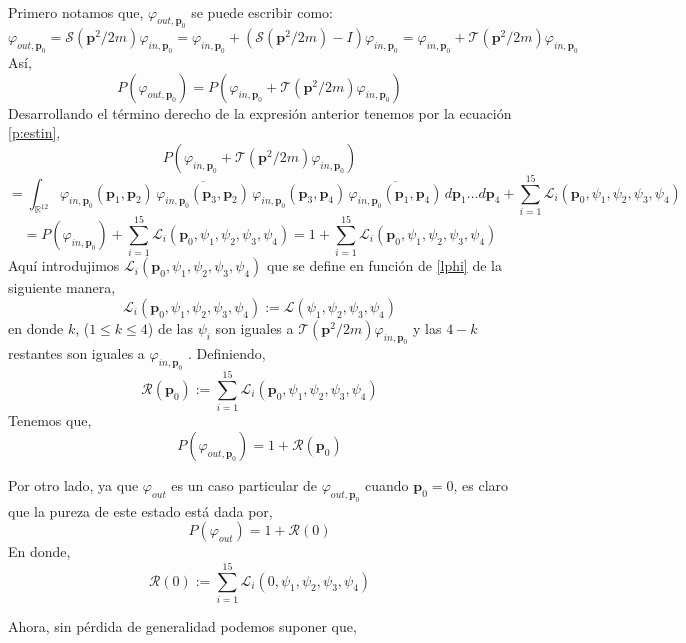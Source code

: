 \documentclass[12pt]{book}
\numberwithin{equation}{chapter}
\def\n{\noindent}
\def\ol{\overline}
\def\R{\mathbb{R}}
\def\S{\mathcal{S}}
\def\T{\mathcal{T}}
\def\L{\mathcal{L}}
\def\Rr{\mathcal{R}}
\def\vp{\varphi}
\def\P{\mathbf{p}}
\begin{document}
\n {\bf Demostraci\'on}\\
Primero notamos que, $\vp_{out,\P_{0}}$ se puede escribir como:
$$ \vp_{out,\P_{0}} = \S(\P^{2}/2m) \vp_{in,\P_{0}} = \vp_{in,\P_{0}} +( \S(\P^{2}/2m) - I ) \vp_{in,\P_{0}} = \vp_{in,\P_{0}} + \T(\P^{2}/2m) \vp_{in,\P_{0}} $$
As\'i,
$$ P(\vp_{out,\P_{0}})= P \left( \vp_{in,\P_{0}} + \T(\P^{2}/2m) \vp_{in,\P_{0}} \right) $$
Desarrollando el t\'ermino derecho de la expresi\'on anterior tenemos por la ecuaci\'on \eqref{p:estin},
$$ P \left(\vp_{in,\P_{0}} + \T(\P^{2}/2m) \vp_{in,\P_{0}} \right) $$
$$ = \int_{\R^{12}} \vp_{in,\P_{0}}(\P_{1},\P_{2}) \, \ol{ \vp_{in,\P_{0}}(\P_{3},\P_{2}) } \, \vp_{in,\P_{0}}(\P_{3},\P_{4}) \, \ol{ \vp_{in,\P_{0}}(\P_{1},\P_{4}) } \, d\P_{1} ... d\P_{4} + \sum_{i=1}^{15} \L_{i}(\P_{0}, \psi_{1},\psi_{2},\psi_{3},\psi_{4}) $$
$$= P(\vp_{in,\P_{0}}) + \sum_{i=1}^{15} \L_{i}(\P_{0}, \psi_{1},\psi_{2},\psi_{3},\psi_{4}) = 1 + \sum_{i=1}^{15} \L_{i}(\P_{0}, \psi_{1},\psi_{2},\psi_{3},\psi_{4}) $$
Aqu\'i introdujimos $\L_{i}(\P_{0}, \psi_{1},\psi_{2},\psi_{3},\psi_{4})$ que se define en funci\'on de \eqref{lphi} de la siguiente manera,
\begin{equation}\label{li_p0}
\L_{i}(\P_{0}, \psi_{1},\psi_{2},\psi_{3},\psi_{4}) := \L(\psi_{1},\psi_{2},\psi_{3},\psi_{4})
\end{equation}
en donde $k$, ($ 1 \leq k \leq 4 $) de las $\psi_{i}$ son iguales a $\T(\P^{2}/2m) \vp_{in,\P_{0}} $ y las $4-k$ restantes son iguales a $\vp_{in,\P_{0}}$ . Definiendo,
\begin{equation}\label{R_p0}
\Rr (\P_{0}) :=\sum_{i=1}^{15} \L_{i}(\P_{0}, \psi_{1},\psi_{2},\psi_{3},\psi_{4})
\end{equation}
Tenemos que,
\begin{equation}\label{p_phiout_p0}
P(\vp_{out,\P_{0}})= 1 + \Rr (\P_{0})
\end{equation}

\n Por otro lado, ya que $\vp_{out}$ es un caso particular de $\vp_{out,\P_{0}}$ cuando $\P_{0}=0$, es claro que la pureza de este estado est\'a dada por,
\begin{equation}\label{p_phiout_0}
P(\vp_{out})= 1 + \Rr (0)
\end{equation}
En donde,
\begin{equation}\label{R0}
\Rr (0) :=\sum_{i=1}^{15} \L_{i}(0, \psi_{1},\psi_{2},\psi_{3},\psi_{4})
\end{equation}

Ahora, sin p\'erdida de generalidad podemos suponer que,
\end{document}
